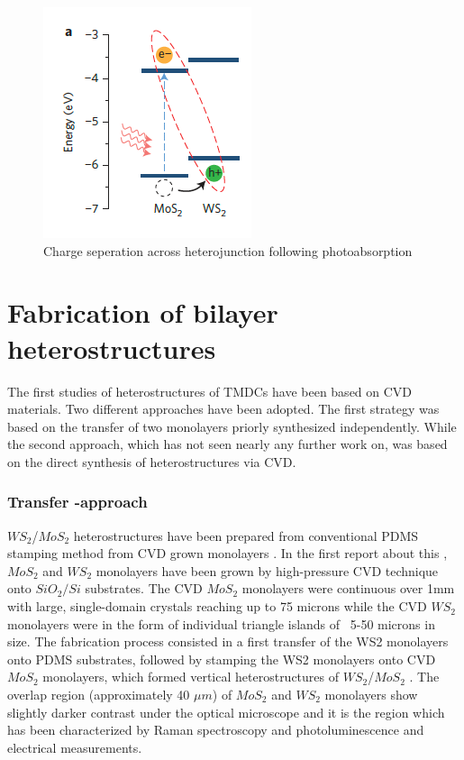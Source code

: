 \begin{figure}[h]
	\begin{center}
		\includegraphics[scale=1]{Heterostructures/HeterostructureChargeSeparationDiagram.png}
		\caption{Charge seperation across heterojunction following photoabsorption}
		\label{fig:HeterostructuresChargeSeperationDiagram}
	\end{center}
\end{figure}

\section{Fabrication of bilayer heterostructures}

The first studies of heterostructures of TMDCs have been based on CVD materials. Two different approaches have been adopted. The first strategy was based on the transfer of two monolayers priorly synthesized independently.  While the second approach, which has not seen nearly any further work on, was based on the direct synthesis of heterostructures via CVD. 

\subsubsection{Transfer -approach}

$WS_2$/$MoS_2$ heterostructures have been prepared from conventional PDMS stamping method from CVD grown monolayers \cite{Tongay2014}. In the first report about this \cite{Gong2014}, $MoS_2$ and $WS_2$ monolayers have been grown by high-pressure CVD technique onto $SiO_2/Si$ substrates. The CVD $MoS_2$ monolayers were continuous over 1mm with large, single-domain crystals reaching up to 75 microns while the CVD $WS_2$ monolayers were in the form of individual triangle islands of ~5-50 microns in size. 
The fabrication process consisted in a first transfer of the WS2 monolayers onto PDMS substrates, followed by stamping the WS2 monolayers onto CVD $MoS_2$ monolayers, which formed vertical heterostructures of $WS_2$/$MoS_2$ \cite{Tongay2014}. The overlap region (approximately 40 ${\mu}m$) of $MoS_2$ and $WS_2$ monolayers show slightly darker contrast under the optical microscope and it is the region which has been characterized by Raman spectroscopy and photoluminescence and electrical measurements.

